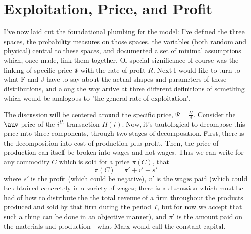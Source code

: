 \section{Exploitation, Price, and Profit}
I've now laid out the foundational plumbing for the model: I've defined the three spaces, the probability measures on those spaces, the variables (both random and physical) central to these spaces, and documented a set of minimal assumptions which, once made, link them together. Of special significance of course was the linking of specific price $\Psi$ with the rate of profit $R$. Next I would like to turn to what F and J have to say about the actual shapes and parameters of these distributions, and along the way arrive at three different definitions of something which would be analogous to "the general rate of exploitation". \par 
The discussion will be centered around the specific price, $\Psi = \frac{\Pi}{\Lambda}$. Consider the $\auw$ price of the $i^{th}$ transaction $\Pi(i)$. Now, it's tautological to decompose this price into three components, through two stages of decomposition. First, there is the decomposition into cost of production plus profit. Then, the price of production can itself be broken into wages and not wages. Thus we can write for any commodity $C$ which is sold for a price $\pi(C)$, that
\[ \pi(C) = \pi' + v' + s' \]
where $s'$ is the profit (which could be negative), $v'$ is the wages paid (which could be obtained concretely in a variety of wages; there is a discussion which must be had of how to distribute the the total revenue of a firm throughout the products produced and sold by that firm during the period $T$, but for now we accept that such a thing can be done in an objective manner), and $\pi'$ is the amount paid on the materials and production - what Marx would call the constant capital. \par 
